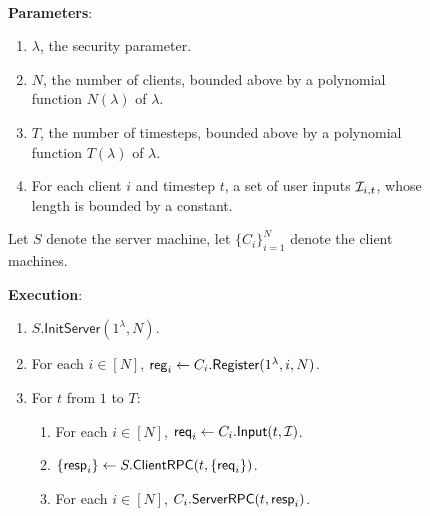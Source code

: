 \begin{figure}[h!]
\begin{framed}
\begin{definition}  \hfill\\
    
\textbf{Parameters}: \begin{enumerate}
    \item $\lambda$, the security parameter.
    \item $N$, the number of clients, bounded above by a polynomial function $N(\lambda)$ of $\lambda$.
    \item $T$, the number of timesteps, bounded above by a polynomial function $T(\lambda)$ of $\lambda$.
    \item For each client $i$ and timestep $t$, a set of user inputs $\mathcal{I}_{i, t}$, whose length is bounded by a constant.
\end{enumerate}

Let $S$ denote the server machine, let $\{C_i\}_{i = 1}^N$ denote the client machines.

\textbf{Execution}:
\begin{enumerate}
\item $S.\mathsf{InitServer}(1^{\lambda}, N)$. 
\item For each $i \in [N]$, $\mathsf{reg}_i \leftarrow C_i.\mathsf{Register}(1^{\lambda}, i, N)$. 
\item For $t$ from $1$ to $T$:
    \begin{enumerate}
    \item For each $i \in [N]$, $\mathsf{req}_i \leftarrow C_i.\mathsf{Input}(t, \mathcal{I})$.
    
    \item $\{\mathsf{resp}_i\} \leftarrow S.\mathsf{ClientRPC}(t, \{\mathsf{req}_i\})$.
    
    \item For each $i \in [N]$, $C_i.\mathsf{ServerRPC}(t, \mathsf{resp}_i)$.
    \end{enumerate}
\end{enumerate}
\end{definition}
\end{framed}
\end{figure}

